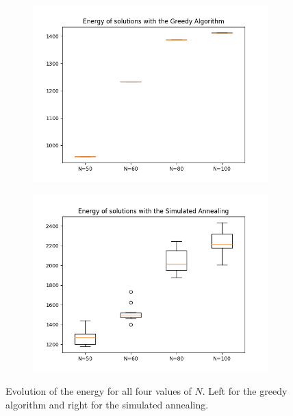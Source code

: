 \documentclass[14pt]
{article}
\begin{document}
\begin{figure}[H]
\centering
\begin{subfigure}{0.49\textwidth}
\centering
\includegraphics[width = \textwidth]{img/energyG.png}
\end{subfigure}
\begin{subfigure}{0.49\textwidth}
\centering
\includegraphics[width = \textwidth]{img/energySA.png}
\end{subfigure}
\caption{\label{E4N} Evolution of the energy for all four values of $N$. Left for the greedy algorithm and right for the simulated annealing.}
\end{figure}
\end{document}
